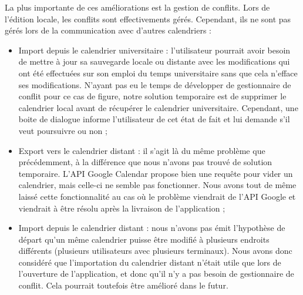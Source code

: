 	La plus importante de ces améliorations est la gestion de conflits. Lors de l'édition locale, les conflits sont effectivements gérés. Cependant, ils ne sont pas gérés lors de la communication avec d'autres calendriers :
	\begin{itemize}
		\item Import depuis le calendrier universitaire : l'utilisateur pourrait avoir besoin de mettre à jour sa sauvegarde locale ou distante avec les modifications qui ont été effectuées sur son emploi du temps universitaire sans que cela n'efface ses modifications. N'ayant pas eu le temps de développer de gestionnaire de conflit pour ce cas de figure, notre solution temporaire est de supprimer le calendrier local avant de récupérer le calendrier universitaire. Cependant, une boite de dialogue informe l'utilisateur de cet état de fait et lui demande s'il veut poursuivre ou non ;
		\item Export vers le calendrier distant : il s'agit là du même problème que précédemment, à la différence que nous n'avons pas trouvé de solution temporaire. L'API Google Calendar propose bien une requête pour \og vider \fg un calendrier, mais celle-ci ne semble pas fonctionner. Nous avons tout de même laissé cette fonctionnalité au cas où le problème viendrait de l'API Google et viendrait à être résolu après la livraison de l'application ;
		\item Import depuis le calendrier distant : nous n'avons pas émit l'hypothèse de départ qu'un même calendrier puisse être modifié à plusieurs endroits différents (plusieurs utilisateurs avec plusieurs terminaux). Nous avons donc considéré que l'importation du calendrier distant n'était utile que lors de l'ouverture de l'application, et donc qu'il n'y a pas besoin de gestionnaire de conflit. Cela pourrait toutefois être amélioré dans le futur.
	\end{itemize}
